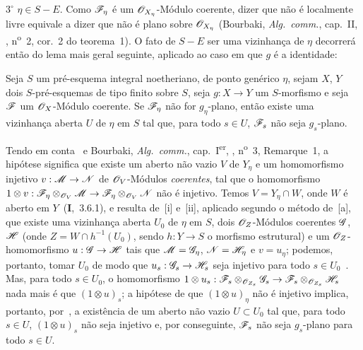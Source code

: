 $3^\circ$ $\eta\in S-E$.
Como $\mathscr{F}_\eta$ é um $\mathscr{O}_{X_\eta}$-Módulo coerente, dizer que não é localmente livre equivale a dizer que não é plano sobre $\mathscr{O}_{X_\eta}$ (Bourbaki, \emph{Alg.\ comm.}, cap.~II, , n\textsuperscript{o}~2, cor.~2 do teorema~1).
O fato de $S-E$ ser uma vizinhança de $\eta$ decorrerá então do lema mais geral seguinte, aplicado ao caso em que $g$ é a identidade:

\begin{lemma}[9.4.7.1]
\label{IV.9.4.7.1}
Seja $S$ um pré-esquema integral noetheriano, de ponto genérico $\eta$, sejam $X$, $Y$ dois $S$-pré-esquemas de tipo finito sobre $S$, seja $g:X\to Y$ um $S$-morfismo e seja $\mathscr{F}$ um $\mathscr{O}_X$-Módulo coerente.
Se $\mathscr{F}_\eta$ não for $g_\eta$-plano, então existe uma vizinhança aberta $U$ de $\eta$ em $S$ tal que, para todo $s\in U$, $\mathscr{F}_s$ não seja $g_s$-plano.
\end{lemma}

Tendo em conta~ e Bourbaki, \emph{Alg.\ comm.}, cap.~I\textsuperscript{er}, , n\textsuperscript{o}~3, Remarque~1, a hipótese significa que existe um aberto não vazio $V$ de $Y_\eta$ e um homomorfismo injetivo $v:\sh{M}\to\sh{N}$ de $\mathscr{O}_V$-Módulos \emph{coerentes}, tal que o homomorfismo $1\otimes v:\sh{F}_\eta\otimes_{\sh{O}_V}\sh{M}\to\sh{F}_\eta\otimes_{\sh{O}_V}\sh{N}$ não é injetivo.
Temos $V=Y_\eta\cap W$, onde $W$ é aberto em $Y$~(\textbf{I},~3.6.1), e resulta de~[i] e~[ii], aplicado segundo o método de~[a], que existe uma vizinhança aberta $U_0$ de $\eta$ em $S$, dois $\mathscr{O}_Z$-Módulos
coerentes $\mathscr{G}$, $\mathscr{H}$ (onde $Z=W\cap h^{-1}(U_0)$, sendo $h:Y\to S$ o morfismo estrutural) e um $\mathscr{O}_Z$-homomorfismo $u:\sh{G}\to\sh{H}$ tais que $\mathscr{M}=\mathscr{G}_\eta$, $\mathscr{N}=\mathscr{H}_\eta$ e $v=u_\eta$; podemos, portanto, tomar $U_0$ de modo que $u_s:\sh{G}_s\to\sh{H}_s$ seja injetivo para todo $s\in U_0$~.
Mas, para todo $s\in U_0$, o homomorfismo $1\otimes u_s:\sh{F}_s\otimes_{\sh{O}_{Z_s}}\sh{G}_s\to\sh{F}_s\otimes_{\sh{O}_{Z_s}}\sh{H}_s$ nada mais é que $(1\otimes u)_s$; a hipótese de que $(1\otimes u)_\eta$ não é injetivo implica, portanto, por~, a existência de um aberto não vazio $U\subset U_0$ tal que, para todo $s\in U$, $(1\otimes u)_s$ não seja injetivo e, por conseguinte, $\mathscr{F}_s$ não seja $g_s$-plano para todo $s\in U$.

